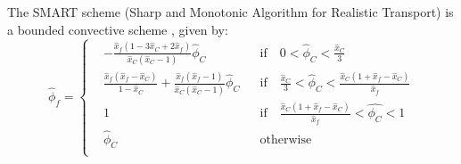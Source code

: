 The SMART scheme (Sharp and Monotonic Algorithm for Realistic Transport) is a bounded convective scheme \cite{gaskell1988curvature}, given by:
\begin{equation}
	\hat{\phi}_f = 
	\left\{
	\begin{aligned}
		&-\frac{\hat{x}_f (1 - 3 \hat{x}_C + 2 \hat{x}_f)}{\hat{x}_C (\hat{x}_C - 1)} \hat{\phi}_C & 
		&\text{if} \quad 0 < \hat{\phi}_C < \frac{\hat{x}_C}{3} \\
		&\frac{\hat{x}_f (\hat{x}_f - \hat{x}_C)}{1 - \hat{x}_C} + \frac{\hat{x}_f (\hat{x}_f - 1)}{\hat{x}_C (\hat{x}_C - 1)} \hat{\phi}_C &
		&\text{if} \quad \frac{\hat{x}_C}{3} < \hat{\phi}_C <  \frac{\hat{x}_C (1 + \hat{x}_f - \hat{x}_C)}{\hat{x}_f} \\
		&1 & &\text{if} \quad \frac{\hat{x}_C (1 + \hat{x}_f - \hat{x}_C)}{\hat{x}_f} < \hat{\phi_C} < 1 \\
		&\hat{\phi}_C & &\text{otherwise} \\
	\end{aligned}
	\right.
\end{equation}

